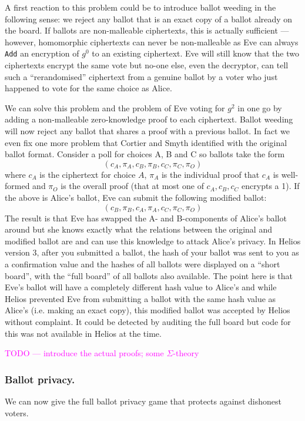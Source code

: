 \documentclass{llncs}
\newcommand{\alg}[1]{\textup{\texttt{#1}}}
\begin{document}
A first reaction to this problem could be to introduce ballot weeding in the
following sense: we reject any ballot that is an exact copy of a ballot already
on the board. If ballots are non-malleable ciphertexts, this is actually
sufficient --- however, homomorphic ciphertexts can never be non-malleable as
Eve can always \alg{Add} an encryption of $g^0$ to an existing ciphertext. Eve
will still know that the two ciphertexts encrypt the same vote but no-one else,
even the decryptor, can tell such a ``rerandomised'' ciphertext from a genuine
ballot by a voter who just happened to vote for the same choice as Alice.

We can solve this problem and the problem of Eve voting for $g^2$ in one go by
adding a non-malleable zero-knowledge proof to each ciphertext. Ballot weeding
will now reject any ballot that shares a proof with a previous ballot. In fact
we even fix one more problem that Cortier and Smyth identified with the original
ballot format. Consider a poll for choices A, B and C so ballots take the form
\[
(c_A, \pi_A, c_B, \pi_B, c_C, \pi_C, \pi_O)
\]
where $c_A$ is the ciphertext for choice $A$, $\pi_A$ is the individual proof
that $c_A$ is well-formed and $\pi_O$ is the overall proof (that at most one
of $c_A, c_B, c_C$ encrypts a 1). If the above is Alice's ballot, Eve can submit
the following modified ballot:
\[
(c_B, \pi_B, c_A, \pi_A, c_C, \pi_C, \pi_O)
\]
The result is that Eve has swapped the A- and B-components of Alice's ballot around but she knows exactly what the relations between the original and
modified ballot are and can use this knowledge to attack Alice's privacy. In
Helios version 3, after you submitted a ballot, the hash of your ballot was
sent to you as a confirmation value and the hashes of all ballots were displayed
on a ``short board'', with the ``full board'' of all ballots also available. The
point here is that Eve's ballot will have a completely different hash value to
Alice's and while Helios prevented Eve from submitting a ballot with the same
hash value as Alice's (i.e. making an exact copy), this modified ballot was
accepted by Helios without complaint. It could be detected by auditing the full
board but code for this was not available in Helios at the time.

\textcolor{Fuchsia}{TODO --- introduce the actual proofs; some $\Sigma$-theory}

\subsubsection{Ballot privacy.}
We can now give the full ballot privacy game that protects against dishonest
voters.
\end{document}
